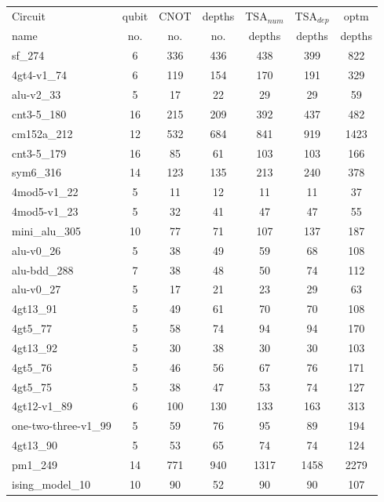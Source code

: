 \documentclass[runningheads]{llncs}
\begin{document}
							\begin{table}[!ht]
								\begin{center}  
								\begin{tabular}{|p{4.3cm}<{\centering}|c|c|c|c|c|c|}
								\hline
								Circuit &  qubit  & CNOT &depths &TSA$_{num}$& TSA$_{dep}$  & optm 	  	\\
								 name	&   no. 	&	no. & no. & depths&  depths &  depths 	\\
								\hline
								sf\_274 & 6 & 336 & 436 & 438 & 399 & 822 \\
								4gt4-v1\_74 & 6 & 119 & 154 & 170 & 191 & 329 \\
								alu-v2\_33 & 5 & 17 & 22 & 29 & 29 & 59 \\
								cnt3-5\_180 & 16 & 215 & 209 & 392 & 437 & 482 \\
							cm152a\_212 & 12 & 532 & 684 & 841 & 919 & 1423 \\
							cnt3-5\_179 & 16 & 85 & 61 & 103 & 103 & 166 \\
							sym6\_316 & 14 & 123 & 135 & 213 & 240 & 378 \\
							4mod5-v1\_22 & 5 & 11 & 12 & 11 & 11 & 37 \\
							4mod5-v1\_23 & 5 & 32 & 41 & 47 & 47 & 55 \\
							mini\_alu\_305 & 10 & 77 & 71 & 107 & 137 & 187 \\
							alu-v0\_26 & 5 & 38 & 49 & 59 & 68 & 108 \\
							alu-bdd\_288 & 7 & 38 & 48 & 50 & 74 & 112 \\
							alu-v0\_27 & 5 & 17 & 21 & 23 & 29 & 63 \\
							4gt13\_91 & 5 & 49 & 61 & 70 & 70 & 108 \\
							4gt5\_77 & 5 & 58 & 74 & 94 & 94 & 170 \\
							4gt13\_92 & 5 & 30 & 38 & 30 & 30 & 103 \\
							4gt5\_76 & 5 & 46 & 56 & 67 & 76 & 171 \\
							4gt5\_75 & 5 & 38 & 47 & 53 & 74 & 127 \\
							4gt12-v1\_89 & 6 & 100 & 130 & 133 & 163 & 313 \\
							one-two-three-v1\_99 & 5 & 59 & 76 & 95 & 89 & 194 \\
							4gt13\_90 & 5 & 53 & 65 & 74 & 74 & 124 \\
							pm1\_249 & 14 & 771 & 940 & 1317 & 1458 & 2279 \\
							ising\_model\_10 & 10 & 90 & 52 & 90 & 90 & 107 \\

\end{tabular}
\end{center}
\end{table}
\end{document}
